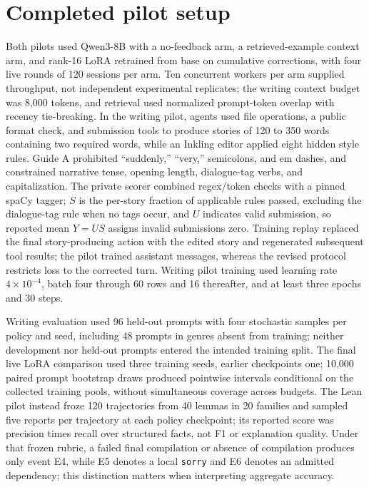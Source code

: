 \documentclass[10pt,twocolumn,letterpaper]{article}
\newcommand{\claim}[2]{#2}
\begin{document}
\section{Completed pilot setup}
\claim{C19}{Both pilots used Qwen3-8B with a no-feedback arm, a retrieved-example context arm, and rank-16 LoRA retrained from base on cumulative corrections, with four live rounds of 120 sessions per arm.}
\claim{C20}{Ten concurrent workers per arm supplied throughput, not independent experimental replicates; the writing context budget was 8,000 tokens, and retrieval used normalized prompt-token overlap with recency tie-breaking.}
\claim{C21}{In the writing pilot, agents used file operations, a public format check, and submission tools to produce stories of 120 to 350 words containing two required words, while an Inkling editor applied eight hidden style rules.}
\claim{C64}{Guide A prohibited ``suddenly,'' ``very,'' semicolons, and em dashes, and constrained narrative tense, opening length, dialogue-tag verbs, and capitalization.}
\claim{C22}{The private scorer combined regex/token checks with a pinned spaCy tagger; $S$ is the per-story fraction of applicable rules passed, excluding the dialogue-tag rule when no tags occur, and $U$ indicates valid submission, so reported mean $Y=U S$ assigns invalid submissions zero.}
\claim{C23}{Training replay replaced the final story-producing action with the edited story and regenerated subsequent tool results; the pilot trained assistant messages, whereas the revised protocol restricts loss to the corrected turn.}
\claim{C63}{Writing pilot training used learning rate $4\times10^{-4}$, batch four through 60 rows and 16 thereafter, and at least three epochs and 30 steps.}

\claim{C24}{Writing evaluation used 96 held-out prompts with four stochastic samples per policy and seed, including 48 prompts in genres absent from training; neither development nor held-out prompts entered the intended training split.}
\claim{C25}{The final live LoRA comparison used three training seeds, earlier checkpoints one; 10,000 paired prompt bootstrap draws produced pointwise intervals conditional on the collected training pools, without simultaneous coverage across budgets.}
\claim{C26}{The Lean pilot instead froze 120 trajectories from 40 lemmas in 20 families and sampled five reports per trajectory at each policy checkpoint; its reported score was precision times recall over structured facts, not F1 or explanation quality.}
\claim{C27}{Under that frozen rubric, a failed final compilation or absence of compilation produces only event E4, while E5 denotes a local \texttt{sorry} and E6 denotes an admitted dependency; this distinction matters when interpreting aggregate accuracy.}
\end{document}
